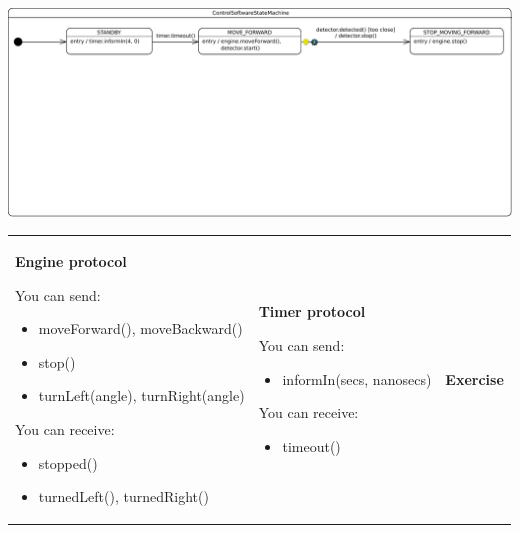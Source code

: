 \documentclass{scrartcl}
\begin{document}
\begin{center}
  \includegraphics[width=\textwidth]{rover-control-juststop}
\end{center}

\begin{tabular}{l l l}
  \begin{minipage}[t]{.3\textwidth}
    \begin{center}
      \textbf{Engine protocol}
    \end{center}

    You can send:
    \begin{itemize}
    \item moveForward(), moveBackward()
    \item stop()
    \item turnLeft(angle), turnRight(angle)
    \end{itemize}

    You can receive:
    \begin{itemize}
    \item stopped()
    \item turnedLeft(), turnedRight()
    \end{itemize}
  \end{minipage}&
  \begin{minipage}[t]{.3\textwidth}
    \begin{center}
      \textbf{Timer protocol}
    \end{center}

    You can send:
    \begin{itemize}
    \item informIn(secs, nanosecs)
    \end{itemize}

    You can receive:
    \begin{itemize}
    \item timeout()
    \end{itemize}
  \end{minipage}&
  \begin{minipage}[t]{.3\textwidth}
    \begin{center}
      \textbf{Exercise}
    \end{center}


\end{minipage}
\end{tabular}
\end{document}
